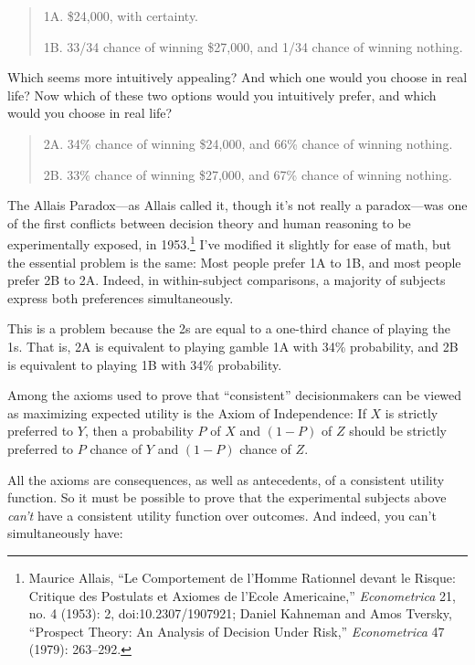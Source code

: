 \begin{quote}
{
 1A. \$24,000, with certainty.}

{
 1B. 33/34 chance of winning \$27,000, and 1/34 chance of winning
 nothing.}
\end{quote}

{
 Which seems more intuitively appealing? And which one would you
choose in real life? Now which of these two options would you
intuitively prefer, and which would you choose in real life?}

\begin{quote}
{
 2A. 34\% chance of winning \$24,000, and 66\% chance of winning
nothing.}

{
 2B. 33\% chance of winning \$27,000, and 67\% chance of winning
 nothing.}
\end{quote}

{
 The Allais Paradox---as Allais called it, though
it's not really a paradox---was one of the first
conflicts between decision theory and human reasoning to be
experimentally exposed, in 1953.\footnote{Maurice Allais, ``Le Comportement de
l'Homme Rationnel devant le Risque: Critique des
Postulats et Axiomes de l'Ecole
Americaine,'' \textit{Econometrica} 21, no. 4 (1953):
2, doi:10.2307/1907921; Daniel Kahneman and Amos Tversky,
``Prospect Theory: An Analysis of Decision Under
Risk,'' \textit{Econometrica} 47 (1979): 263--292.}
I've modified it slightly for ease of math, but the
essential problem is the same: Most people prefer 1A to 1B, and most
people prefer 2B to 2A. Indeed, in within-subject comparisons, a
majority of subjects express both preferences simultaneously.}

{
 This is a problem because the 2s are equal to a one-third chance
of playing the 1s. That is, 2A is equivalent to playing gamble 1A with
34\% probability, and 2B is equivalent to playing 1B with 34\%
probability.}

{
 Among the axioms used to prove that
``consistent'' decisionmakers can be
viewed as maximizing expected utility is the Axiom of Independence: If
$X$ is strictly preferred to $Y$, then a probability $P$ of $X$ and $(1 - P)$ of
$Z$ should be strictly preferred to $P$ chance of $Y$ and $(1 - P)$ chance of
$Z$.}

{
 All the axioms are consequences, as well as antecedents, of a
consistent utility function. So it must be possible to prove that the
experimental subjects above \textit{can't} have a
consistent utility function over outcomes. And indeed, you
can't simultaneously have:}

